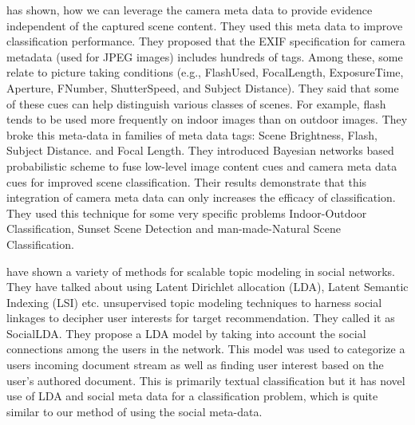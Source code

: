 \citet*{Boutell2005935} has shown, how we can leverage the camera meta data to provide evidence independent of the captured scene content. They used this meta data to improve classification performance. They proposed that the EXIF specification for camera metadata (used for JPEG images) includes hundreds of tags. Among these, some relate to picture taking conditions (e.g., FlashUsed, FocalLength, ExposureTime, Aperture, FNumber, ShutterSpeed, and Subject Distance). They said that some of these cues can help distinguish various classes of scenes. For example, flash tends to be used more frequently on indoor images than on outdoor images. They broke this meta-data in families of meta data tags: Scene Brightness, Flash, Subject Distance. and Focal Length. They introduced  Bayesian networks based  probabilistic scheme to fuse low-level image content cues and camera meta data cues for improved scene classification. Their results demonstrate that  this integration of camera meta data can only increases the efficacy of classification. They used this technique for some very specific problems  Indoor-Outdoor Classification, Sunset Scene Detection and man-made-Natural Scene Classification.


 have shown a variety of methods for scalable topic modeling in social networks.  They have 
talked about using Latent Dirichlet allocation (LDA), Latent Semantic Indexing (LSI) etc. unsupervised topic modeling techniques to harness social linkages to decipher user interests for target recommendation. They called it as SocialLDA. They propose a LDA model by taking into account the social connections among the users in the network. This model was used to categorize a users incoming document stream as well as finding user interest based on the user’s authored document. This is primarily textual classification but it has novel use of LDA and social meta data for a classification problem, which is quite similar to our method of using the social meta-data.


